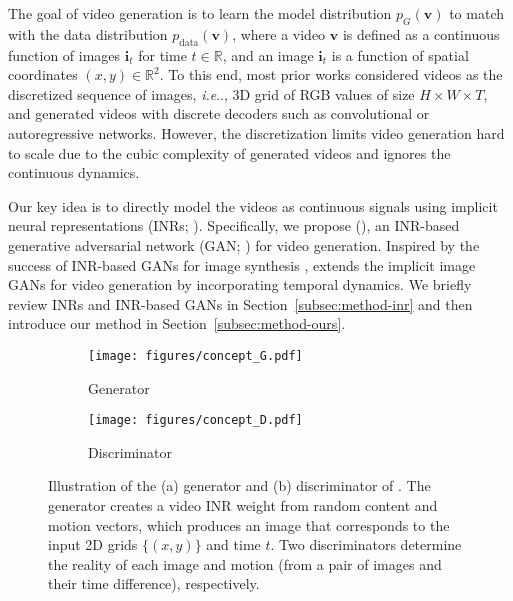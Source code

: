 \documentclass{article} \usepackage{iclr2022_conference,times}
\makeatletter
\DeclareRobustCommand\onedot{\futurelet\@let@token\@onedot}
\def\@onedot{\ifx\@let@token.\else.\null\fi\xspace}
\def\ie{\emph{i.e}\onedot} \def\Ie{\emph{I.e}\onedot}
\makeatother
\begin{document}
The goal of video generation is to learn the model distribution $p_G(\mathbf{v})$ to match with the data distribution $p_{\text{data}}(\mathbf{v})$, where a video $\mathbf{v}$ is defined as a continuous function of images $\mathbf{i}_t$ for time $t \in \mathbb{R}$, and an image $\mathbf{i}_t$ is a function of spatial coordinates $(x,y) \in \mathbb{R}^2$. To this end, most prior works considered videos as the discretized sequence of images, \ie, 3D grid of RGB values of size $H \times W \times T$, and generated videos with discrete decoders such as convolutional \citep{tian2021good} or autoregressive \citep{yan2021videogpt} networks. However, the discretization limits video generation hard to scale due to the cubic complexity of generated videos and ignores the continuous dynamics.

Our key idea is to directly model the videos as continuous signals using implicit neural representations (INRs; \citet{sitzmann2020implicit,tancik2020fourier}). Specifically, we propose \emph{\lname} (\sname), an INR-based generative adversarial network (GAN; \citet{goodfellow2014generative}) for video generation. Inspired by the success of INR-based GANs for image synthesis \citep{skorokhodov2021adversarial,anokhin2021image}, \sname extends the implicit image GANs for video generation by incorporating temporal dynamics. We briefly review INRs and INR-based GANs in Section~\ref{subsec:method-inr} and then introduce our method \sname in Section~\ref{subsec:method-ours}.

\begin{figure*}[t]
\centering\small
\vspace{-0.1in}
\begin{subfigure}{0.45\textwidth}
\texttt{[image: figures/concept\_G.pdf]}
\caption{
Generator
}\label{fig:concept_G}
\end{subfigure}
\begin{subfigure}{0.45\textwidth}
\texttt{[image: figures/concept\_D.pdf]}
\caption{
Discriminator
}\label{fig:concept_D}
\end{subfigure}
\vspace{-0.05in}
\caption{
Illustration of the (a) generator and (b) discriminator of \sname. The generator creates a video INR weight from random content and motion vectors, which produces an image that corresponds to the input 2D grids $\{(x,y)\}$ and time $t$. Two discriminators determine the reality of each image and motion (from a pair of images and their time difference), respectively.
}\label{fig:concept}
\vspace{-0.15in}
\end{figure*}
\end{document}
